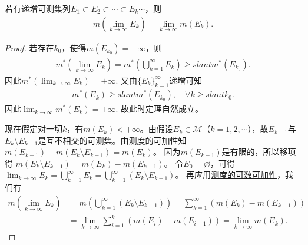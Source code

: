 \documentclass[../../main.tex]{subfiles}
\begin{document}
\begin{theorem}[递增可测集列的测度运算]\label{theorem:递增可测集列的测度运算}
若有递增可测集列$E_1\subset E_2\subset\cdots\subset E_k\cdots$，则
\begin{align}
m\left(\lim_{k\to\infty}E_k\right)=\lim_{k\to\infty}m(E_k).\label{eq:2.4}
\end{align}
\end{theorem}
\begin{proof}
若存在$k_0$，使得$m(E_{k_0})=+\infty$，则
\begin{align*}
m^*\left(\lim_{k\rightarrow \infty}E_k\right) = m^*\left(\bigcup_{k=1}^{\infty}E_k\right)\geqslant slant m^*(E_{k_0}).
\end{align*}
因此$m^*\left(\lim_{k\rightarrow \infty}E_k\right) = +\infty$. 又由$\{E_k\}_{k=1}^{\infty}$递增可知
\begin{align*}
m^*(E_k) \geqslant slant m^*(E_{k_0}), \quad \forall k \geqslant slant k_0.
\end{align*}
因此$\lim_{k\rightarrow \infty}m^*(E_k) = +\infty$.
故此时定理自然成立。

现在假定对一切$k$，有$m(E_k)<+\infty$。由假设$E_k\in\mathscr{M}$（$k = 1,2,\cdots$），故$E_{k - 1}$与$E_k\setminus E_{k - 1}$是互不相交的可测集。由测度的可加性知
$m(E_{k - 1})+m(E_k\setminus E_{k - 1})=m(E_k)$。
因为$m(E_{k - 1})$是有限的，所以移项得
$m(E_k\setminus E_{k - 1})=m(E_k)-m(E_{k - 1})$。
令$E_0 = \varnothing$，可得
$\lim_{k\to\infty}E_k=\bigcup_{k = 1}^{\infty}E_k=\bigcup_{k = 1}^{\infty}(E_k\setminus E_{k - 1})$。
再应用\hyperref[theorem:测度的基本性质]{测度的可数可加性}，我们有
\begin{align*}
m\left(\lim_{k\to\infty}E_k\right)&=m\left(\bigcup_{k = 1}^{\infty}(E_k\setminus E_{k - 1})\right)
=\sum_{k = 1}^{\infty}(m(E_k)-m(E_{k - 1}))\\
&=\lim_{k\to\infty}\sum_{i = 1}^{k}(m(E_i)-m(E_{i - 1}))
=\lim_{k\to\infty}m(E_k).
\end{align*}
\end{proof}
\end{document}
